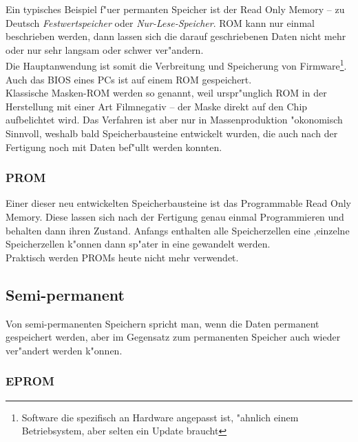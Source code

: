 					Ein typisches Beispiel f"uer permanten Speicher ist der \glqq Read Only Memory \grqq{} – zu Deutsch \textit{Festwertspeicher} oder \textit{Nur-Lese-Speicher}. ROM kann nur einmal beschrieben werden, dann lassen sich die darauf geschriebenen Daten nicht mehr oder nur sehr langsam oder schwer ver"andern. 
					\\
					Die Hauptanwendung ist somit die Verbreitung und Speicherung von Firmware\footnote{Software die spezifisch an Hardware angepasst ist, "ahnlich einem Betriebsystem, aber selten ein Update braucht}. Auch das BIOS eines PCs ist auf einem ROM gespeichert.
					\\
					Klassische Masken-ROM werden so genannt, weil urspr"unglich ROM in der Herstellung mit einer Art Filmnegativ – der \glqq Maske\grqq{} direkt auf den Chip aufbelichtet wird. Das Verfahren ist aber nur in Massenproduktion "okonomisch Sinnvoll, weshalb bald Speicherbausteine entwickelt wurden, die auch nach der Fertigung noch mit Daten bef"ullt werden konnten.
				
				\subsubsection{PROM}
				\label{ch:Technisch:sec:Elektronische Speicherung:sub:Fl"uchtig:subsub:PROM}
				
					Einer dieser neu entwickelten Speicherbausteine ist das \glqq Programmable Read Only Memory\grqq{}. Diese lassen sich nach der Fertigung genau einmal Programmieren und behalten dann ihren Zustand. Anfangs enthalten alle Speicherzellen eine \grqq{},einzelne Speicherzellen k"onnen dann sp"ater in eine  \grqq{} gewandelt werden.
					\\
					Praktisch werden PROMs heute nicht mehr verwendet. 
            
        \subsection{Semi-permanent}
        \label{ch:Technisch:sec:Elektronische Speicherung:sub:Semi-permanent}
        
            Von semi-permanenten Speichern spricht man, wenn die Daten permanent gespeichert werden, aber im Gegensatz zum permanenten Speicher auch wieder ver"andert werden k"onnen. 
			
				\subsubsection{EPROM}
				\label{ch:Technisch:sec:Elektronische Speicherung:sub:Fl"uchtig:subsub:EPROM}
					
